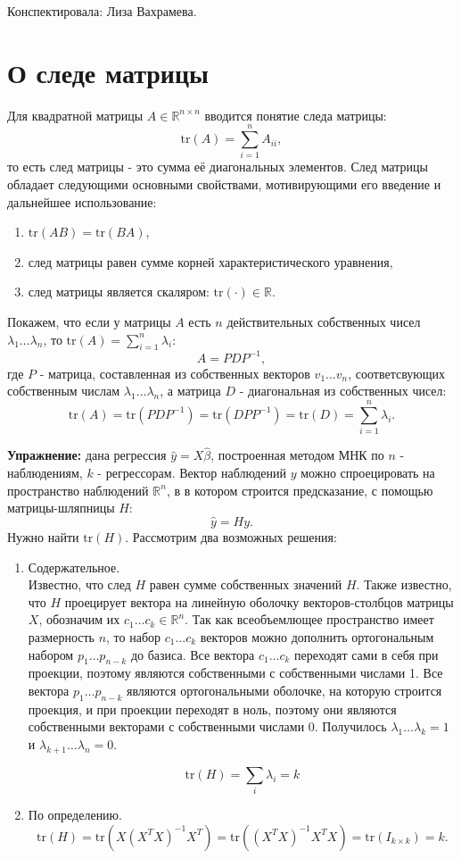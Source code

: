 \documentclass[12pt]{article} %
\theoremstyle{definition} %
\begin{document}
Конспектировала: Лиза Вахрамева.

\section{О следе матрицы}
Для квадратной матрицы $A \in \mathbb{R}^{n \times n}$ вводится понятие следа
матрицы:
$$\text{tr}(A) = \sum_{i=1}^n A_{ii},$$
то есть след матрицы - это сумма её диагональных элементов. След матрицы обладает следующими основными свойствами, мотивирующими его введение и дальнейшее использование:
\begin{enumerate}
    \item $\text{tr}(AB) = \text{tr}(BA)$,
    \item след матрицы равен сумме корней характеристического уравнения,\\
    \item след матрицы является скаляром: $\text{tr}(\cdot) \in \mathbb{R}$.
\end{enumerate}
Покажем, что если у матрицы $A$ есть $n$ действительных собственных чисел
$\lambda_1 \dots \lambda_n$, то $\text{tr}(A) = \sum_{i=1}^n \lambda_i$:
$$A = PDP^{-1},$$
где $P$ - матрица, составленная из собственных векторов $v_1 \dots v_n$, соответсвующих собственным числам $\lambda_1 \dots \lambda_n$, а матрица
$D$ - диагональная из собственных чисел:
$$\text{tr}(A) = \text{tr}(PDP^{-1}) = \text{tr}(D PP^{-1})
= \text{tr}(D) = \sum_{i=1}^n \lambda_i.$$

\textbf{Упражнение:} дана регрессия $\hat{y} = X\hat{\beta}$, построенная методом МНК по $n$ - наблюдениям, $k$ - регрессорам. Вектор наблюдений $y$ можно спроецировать на пространство наблюдений $\mathbb{R}^n$, в в котором строится предсказание, с помощью матрицы-шляпницы $H$:
$$\hat{y} = Hy.$$
Нужно найти $\text{tr}(H)$. Рассмотрим два возможных решения:
\begin{enumerate}
    \item Содержательное. \\
    Известно, что след $H$ равен сумме собственных значений $H$. Также известно, что  $H$ проецирует вектора на линейную оболочку векторов-столбцов матрицы $X$, обозначим их $c_1 \dots c_k \in \mathbb{R}^n$. Так как всеобъемлющее пространство имеет размерность $n$, то набор $c_1 \dots c_k$ векторов можно дополнить ортогональным набором $p_1 \dots p_{n-k}$ до базиса. Все вектора $c_1 \dots c_k$ переходят сами в себя при проекции, поэтому являются собственными с собственными числами 1. Все вектора $p_1 \dots p_{n-k}$
    являются ортогональными оболочке, на которую строится проекция, и при проекции переходят в ноль, поэтому они являются собственными векторами с собственными числами 0. Получилось $\lambda_1 \dots \lambda_k = 1$ и $\lambda_{k+1} \dots \lambda_n = 0$.
    
    $$\text{tr}(H) = \sum_i \lambda_i = k$$
    
    \item По определению.
    $$ \text{tr}(H) = \text{tr} (X(X^TX)^{-1}X^T) =
      \text{tr} ((X^TX)^{-1} X^TX) = \text{tr} (I_{k \times k}) = k.$$
\end{enumerate}
\end{document}
